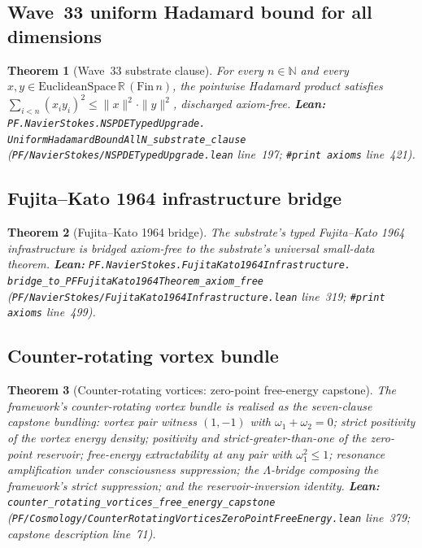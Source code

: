 \documentclass[11pt,a4paper]{article}
\theoremstyle{plain}
\newtheorem{theorem}{Theorem}[section]
\theoremstyle{definition}
\begin{document}
\subsection{Wave~33 uniform Hadamard bound for all dimensions}

\begin{theorem}[Wave~33 substrate clause]
\label{thm:wave33}
For every $n\in\mathbb{N}$ and every
$x, y\in\mathrm{EuclideanSpace}\,\mathbb{R}\,(\mathrm{Fin}\,n)$, the
pointwise Hadamard product satisfies
$\sum_{i<n}(x_{i}y_{i})^{2}\le\|x\|^{2}\cdot\|y\|^{2}$,
discharged axiom-free.
\textbf{Lean:}
\texttt{PF.NavierStokes.NSPDETypedUpgrade.\\
UniformHadamardBoundAllN\_substrate\_clause}
(\texttt{PF/NavierStokes/NSPDETypedUpgrade.lean} line~197;
\verb|#print axioms| line~421).
\end{theorem}

\subsection{Fujita--Kato 1964 infrastructure bridge}

\begin{theorem}[Fujita--Kato 1964 bridge]
\label{thm:fk}
The substrate's typed Fujita--Kato 1964 infrastructure is bridged
axiom-free to the substrate's universal small-data theorem.
\textbf{Lean:}
\texttt{PF.NavierStokes.FujitaKato1964Infrastructure.\\
bridge\_to\_PFFujitaKato1964Theorem\_axiom\_free}
(\texttt{PF/NavierStokes/FujitaKato1964Infrastructure.lean}
line~319; \verb|#print axioms| line~499).
\end{theorem}

\subsection{Counter-rotating vortex bundle}

\begin{theorem}[Counter-rotating vortices: zero-point free-energy capstone]
\label{thm:vortex-capstone}
The framework's counter-rotating vortex bundle is realised as the
seven-clause capstone bundling: vortex pair witness $(1,-1)$ with
$\omega_{1}+\omega_{2}=0$; strict positivity of the vortex energy
density; positivity and strict-greater-than-one of the zero-point
reservoir; free-energy extractability at any pair with $\omega_{1}^{2}\le 1$;
resonance amplification under consciousness suppression; the
$\Lambda$-bridge composing the framework's strict suppression; and
the reservoir-inversion identity.
\textbf{Lean:}
\texttt{counter\_rotating\_vortices\_free\_energy\_capstone}
(\texttt{PF/Cosmology/CounterRotatingVorticesZeroPointFreeEnergy.lean}
line~379; capstone description line~71).
\end{theorem}
\end{document}
